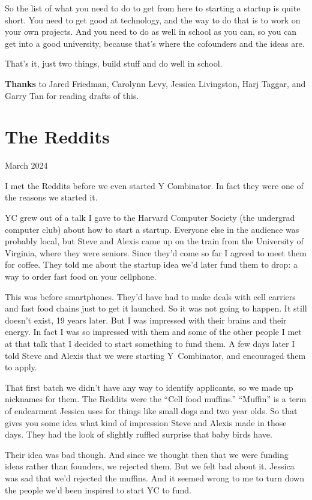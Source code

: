\documentclass[12pt]{book}
\begin{document}
So the list of what you need to do to get from here to starting a
startup is quite short. You need to get good at technology, and the way
to do that is to work on your own projects. And you need to do as well
in school as you can, so you can get into a good university, because
that's where the cofounders and the ideas are.

That's it, just two things, build stuff and do well in school.


\textbf{Thanks} to Jared Friedman, Carolynn Levy, Jessica Livingston,
Harj Taggar, and Garry Tan for reading drafts of this.
\chapter{The Reddits}

March 2024

I met the Reddits before we even started Y Combinator. In fact they were
one of the reasons we started it.

YC grew out of a talk I gave to the Harvard Computer Society (the
undergrad computer club) about how to start a startup. Everyone else in
the audience was probably local, but Steve and Alexis came up on the
train from the University of Virginia, where they were seniors. Since
they'd come so far I agreed to meet them for coffee. They told me about
the startup idea we'd later fund them to drop: a way to order fast food
on your cellphone.

This was before smartphones. They'd have had to make deals with cell
carriers and fast food chains just to get it launched. So it was not
going to happen. It still doesn't exist, 19 years later. But I was
impressed with their brains and their energy. In fact I was so impressed
with them and some of the other people I met at that talk that I decided
to start something to fund them. A few days later I told Steve and
Alexis that we were starting Y~Combinator, and encouraged them to apply.

That first batch we didn't have any way to identify applicants, so we
made up nicknames for them. The Reddits were the ``Cell food muffins.''
``Muffin'' is a term of endearment Jessica uses for things like small
dogs and two year olds. So that gives you some idea what kind of
impression Steve and Alexis made in those days. They had the look of
slightly ruffled surprise that baby birds have.

Their idea was bad though. And since we thought then that we were
funding ideas rather than founders, we rejected them. But we felt bad
about it. Jessica was sad that we'd rejected the muffins. And it seemed
wrong to me to turn down the people we'd been inspired to start YC to
fund.
\end{document}
